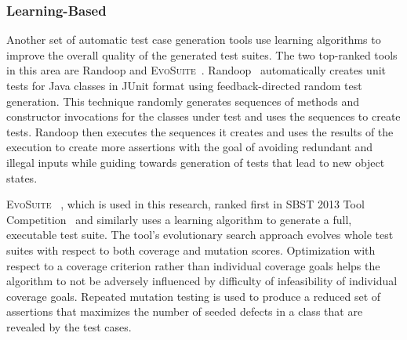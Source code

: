 \subsubsection{Learning-Based}
Another set of automatic test case generation tools use learning algorithms to improve the overall quality of the generated test suites.  The two top-ranked tools in this area are Randoop and \textsc{EvoSuite}~\cite{fraser2013a}.  Randoop~\cite{pacheco2007feedback} automatically creates unit tests for Java classes in JUnit format using feedback-directed random test generation. This technique randomly generates sequences of methods and constructor invocations for the classes under test and uses the sequences to create tests. Randoop then executes the sequences it creates and uses the results of the execution to create more assertions with the goal of avoiding redundant and illegal inputs while guiding towards generation of tests that lead to new object states. 

\textsc{EvoSuite}~\cite{fraser:2011:eat:2025113.2025179} , which is used in this research, ranked first in SBST 2013 Tool Competition~\cite{fraser2013a} and similarly uses a learning algorithm to generate a full, executable test suite.  The tool's evolutionary search approach evolves whole test suites with respect to both coverage and mutation scores.  Optimization with respect to a coverage criterion rather than individual coverage goals helps the algorithm to not be adversely influenced by difficulty of infeasibility of individual coverage goals.  Repeated mutation testing is used to produce a reduced set of assertions that maximizes the number of seeded defects in a class that are revealed by the test cases.

